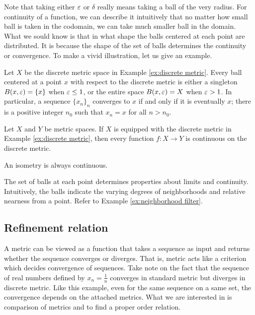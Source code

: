 Note that taking either $\varepsilon$ or $\delta$ really means taking a ball of the very radius.
For continuity of a function, we can describe it intuitively that no matter how small ball is taken in the codomain, we can take much smaller ball in the domain.
What we sould know is that in what shape the balls centered at each point are distributed.
It is because the shape of the set of balls determines the continuity or convergence.
To make a vivid illustration, let us give an example.

\begin{ex}
Let $X$ be the discrete metric space in Example \ref{ex:discrete metric}.
Every ball centered at a point $x$ with respect to the discrete metric is either a singleton $B(x,\varepsilon)=\{x\}$ when $\varepsilon\le1$, or the entire space $B(x,\varepsilon)=X$ when $\varepsilon>1$.
In particular, a sequence $\{x_n\}_n$ converges to $x$ if and only if it is eventually $x$; there is a positive integer $n_0$ such that $x_n=x$ for all $n>n_0$.
\end{ex}
\begin{ex}
Let $X$ and $Y$ be metric spaces.
If $X$ is equipped with the discrete metric in Example \ref{ex:discrete metric}, then every function $f:X\to Y$ is continuous on the discrete metric.
\end{ex}
\begin{ex}
An isometry is always continuous.
\end{ex}

The set of balls at each point determines properties about limits and continuity.
Intuitively, the balls indicate the varying degrees of neighborhoods and relative nearness from a point.
Refer to Example \ref{ex:neighborhood filter}.



\subsection{Refinement relation}

A metric can be viewed as a function that takes a sequence as input and returns whether the sequence converges or diverges.
That is, metric acts like a criterion which decides convergence of sequences.
Take note on the fact that the sequence of real numbers defined by $x_n=\frac1n$ converges in standard metric but diverges in discrete metric.
Like this example, even for the same sequence on a same set, the convergence depends on the attached metrics.
What we are interested in is comparison of metrics and to find a proper order relation.




